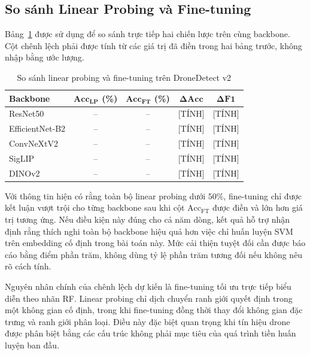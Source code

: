 \documentclass[../DoAn.tex]{subfiles}
\begin{document}
\subsection{So sánh Linear Probing và Fine-tuning}

Bảng~\ref{tab:lp_ft_comparison} được sử dụng để so sánh trực tiếp hai chiến lược trên cùng backbone. Cột chênh lệch phải được tính từ các giá trị đã điền trong hai bảng trước, không nhập bằng ước lượng.

\begin{table}[H]
    \centering
    \caption{So sánh linear probing và fine-tuning trên DroneDetect v2}
    \label{tab:lp_ft_comparison}
    \renewcommand{\arraystretch}{1.3}
    \begin{tabular}{|p{}|c|c|c|c|}
        \hline
        \textbf{Backbone} & $\mathbf{Acc_{LP}}$ \textbf{(\%)} & $\mathbf{Acc_{FT}}$ \textbf{(\%)} & $\boldsymbol{\Delta Acc}$ & $\boldsymbol{\Delta F1}$ \\ \hline
        ResNet50 & -- & -- & [TÍNH] & [TÍNH] \\ \hline
        EfficientNet-B2 & -- & -- & [TÍNH] & [TÍNH] \\ \hline
        ConvNeXtV2 & -- & -- & [TÍNH] & [TÍNH] \\ \hline
        SigLIP & -- & -- & [TÍNH] & [TÍNH] \\ \hline
        DINOv2 & -- & -- & [TÍNH] & [TÍNH] \\ \hline
    \end{tabular}
\end{table}


Với thông tin hiện có rằng toàn bộ linear probing dưới $50\%$, fine-tuning chỉ được kết luận vượt trội cho từng backbone sau khi cột $\mathrm{Acc_{FT}}$ được điền và lớn hơn giá trị tương ứng. Nếu điều kiện này đúng cho cả năm dòng, kết quả hỗ trợ nhận định rằng thích nghi toàn bộ backbone hiệu quả hơn việc chỉ huấn luyện SVM trên embedding cố định trong bài toán này. Mức cải thiện tuyệt đối cần được báo cáo bằng điểm phần trăm, không dùng tỷ lệ phần trăm tương đối nếu không nêu rõ cách tính.

Nguyên nhân chính của chênh lệch dự kiến là fine-tuning tối ưu trực tiếp biểu diễn theo nhãn RF. Linear probing chỉ dịch chuyển ranh giới quyết định trong một không gian cố định, trong khi fine-tuning đồng thời thay đổi không gian đặc trưng và ranh giới phân loại. Điều này đặc biệt quan trọng khi tín hiệu drone được phân biệt bằng các cấu trúc không phải mục tiêu của quá trình tiền huấn luyện ban đầu.
\end{document}
